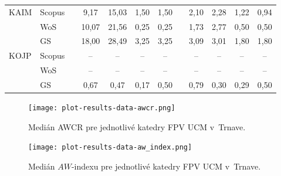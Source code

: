 \begin{table}
\begin{tabularx}{\textwidth}{XXp{0.2ex}ccccp{0.2ex}cccc}
    KAIM & Scopus & & 9,17   & 15,03  & 1,50   & 1,50   & & 2,10  & 2,28 & 1,22  & 0,94 \\
         & WoS    & & 10,07  & 21,56  & 0,25   & 0,25   & & 1,73  & 2,77 & 0,50  & 0,50 \\
         & GS     & & 18,00  & 28,49  & 3,25   & 3,25   & & 3,09  & 3,01 & 1,80  & 1,80 \\[1ex]
    KOJP & Scopus & & --     & --     & --     & --     & & --    & --   & --    & --   \\
         & WoS    & & --     & --     & --     & --     & & --    & --   & --    & --   \\
         & GS     & & 0,67   & 0,47   & 0,17   & 0,50   & & 0,79  & 0,30 & 0,29  & 0,50 \\
    \bottomrule
  \end{tabularx}
\end{table}

\begin{figure}
  \centering
  \texttt{[image: plot-results-data-awcr.png]}
  \caption[Medián AWCR pre jednotlivé katedry FPV UCM v~Trnave]%
  {Medián AWCR pre jednotlivé katedry FPV UCM v~Trnave.}
  \label{fig:awcr.plot}
\end{figure}

\begin{figure}
  \centering
  \texttt{[image: plot-results-data-aw\_index.png]}
  \caption[Medián $AW$-indexu pre jednotlivé katedry FPV UCM v~Trnave]%
  {Medián $AW$-indexu pre jednotlivé katedry FPV UCM v~Trnave.}
  \label{fig:aw-index.plot}
\end{figure}

